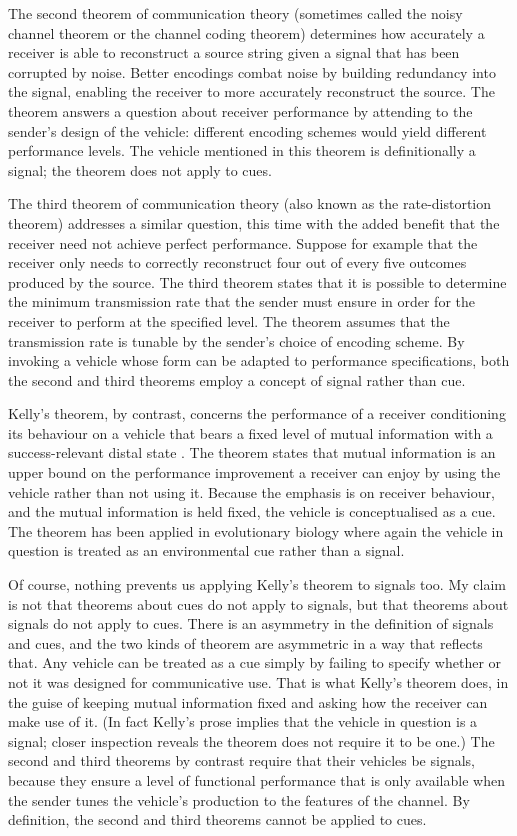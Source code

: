 \documentclass[12pt]{article}
\begin{document}
The second theorem of communication theory (sometimes called the noisy channel theorem or the channel coding theorem) determines how accurately a receiver is able to reconstruct a source string given a signal that has been corrupted by noise.
Better encodings combat noise by building redundancy into the signal, enabling the receiver to more accurately reconstruct the source.
The theorem answers a question about receiver performance by attending to the sender's design of the vehicle: different encoding schemes would yield different performance levels.
The vehicle mentioned in this theorem is definitionally a signal; the theorem does not apply to cues.

The third theorem of communication theory (also known as the rate-distortion theorem) addresses a similar question, this time with the added benefit that the receiver need not achieve perfect performance.
Suppose for example that the receiver only needs to correctly reconstruct four out of every five outcomes produced by the source.
The third theorem states that it is possible to determine the minimum transmission rate that the sender must ensure in order for the receiver to perform at the specified level.
The theorem assumes that the transmission rate is tunable by the sender's choice of encoding scheme.
By invoking a vehicle whose form can be adapted to performance specifications, both the second and third theorems employ a concept of signal rather than cue.

Kelly's theorem, by contrast, concerns the performance of a receiver conditioning its behaviour on a vehicle that bears a fixed level of mutual information with a success-relevant distal state \citep{kelly1956new}.
The theorem states that mutual information is an upper bound on the performance improvement a receiver can enjoy by using the vehicle rather than not using it.
Because the emphasis is on receiver behaviour, and the mutual information is held fixed, the vehicle is conceptualised as a cue.
The theorem has been applied in evolutionary biology \citep{donaldson-matasci2010fitness} where again the vehicle in question is treated as an environmental cue rather than a signal.

Of course, nothing prevents us applying Kelly's theorem to signals too.
My claim is not that theorems about cues do not apply to signals, but that theorems about signals do not apply to cues.
There is an asymmetry in the definition of signals and cues, and the two kinds of theorem are asymmetric in a way that reflects that.
Any vehicle can be treated as a cue simply by failing to specify whether or not it was designed for communicative use.
That is what Kelly's theorem does, in the guise of keeping mutual information fixed and asking how the receiver can make use of it.
(In fact Kelly's prose implies that the vehicle in question is a signal; closer inspection reveals the theorem does not require it to be one.)
The second and third theorems by contrast require that their vehicles be signals, because they ensure a level of functional performance that is only available when the sender tunes the vehicle's production to the features of the channel.
By definition, the second and third theorems cannot be applied to cues.
\end{document}
